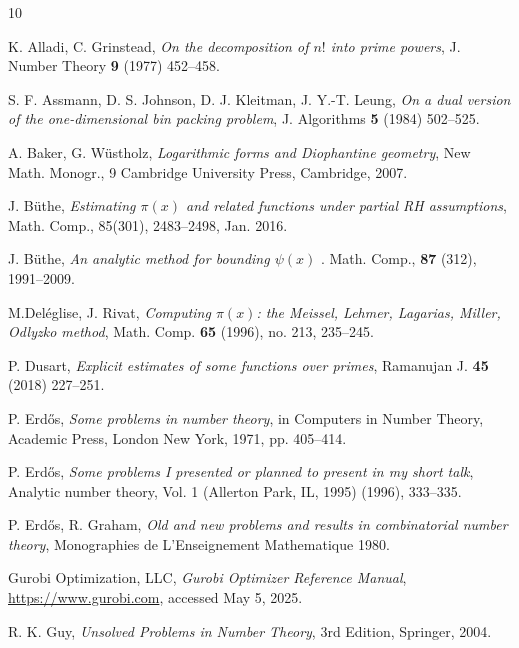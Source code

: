 \documentclass[10pt,a4paper,reqno]{amsart}
\numberwithin{equation}{section}
\theoremstyle{plain}
\theoremstyle{definition}
\begin{document}
\begin{thebibliography}{10}


K. Alladi, C. Grinstead, \emph{On the decomposition of $n!$ into prime powers}, J. Number Theory \textbf{9} (1977) 452--458.

S. F. Assmann, D. S. Johnson, D. J. Kleitman, J. Y.-T. Leung, \emph{On a dual version of the one-dimensional bin packing problem}, J. Algorithms \textbf{5} (1984) 502--525.

A. Baker, G. W\"ustholz, \emph{Logarithmic forms and Diophantine geometry}, New Math. Monogr., 9 Cambridge University Press, Cambridge, 2007.

J. B\"uthe, \emph{Estimating $\pi(x)$ and related functions under partial RH assumptions}, Math. Comp., 85(301), 2483--2498, Jan. 2016.

J. B\"uthe, \emph{An analytic method for bounding $\psi(x)$
}. Math. Comp., \textbf{87} (312), 1991--2009.



M.Del\'eglise, J. Rivat, \emph{Computing $\pi(x)$: the Meissel, Lehmer, Lagarias, Miller, Odlyzko method}, Math. Comp. \textbf{65} (1996), no. 213, 235--245.

P. Dusart, \emph{Explicit estimates of some functions over primes}, Ramanujan J. \textbf{45} (2018) 227--251.

P. Erd\H{o}s, \emph{Some problems in number theory}, in Computers in Number Theory, Academic Press, London New York, 1971, pp. 405--414.

P. Erd\H{o}s, \emph{Some problems I presented or planned to present in my short talk}, Analytic number theory, Vol. 1 (Allerton Park, IL, 1995) (1996), 333--335.

P. Erd\H{o}s, R. Graham, \emph{Old and new problems and results in combinatorial number theory}, Monographies de L'Enseignement Mathematique 1980.

Gurobi Optimization, LLC, \emph{Gurobi Optimizer Reference Manual}, \url{https://www.gurobi.com}, accessed May 5, 2025.

R. K. Guy, \emph{Unsolved Problems in Number Theory}, 3rd Edition, Springer, 2004.


\end{thebibliography}
\end{document}
